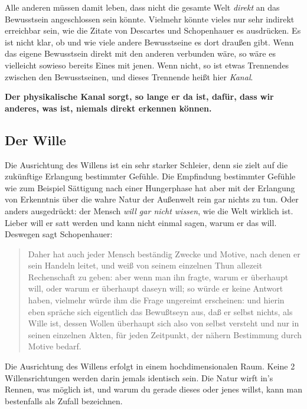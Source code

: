 \documentclass[12pt]{book}
\begin{document}
Alle anderen müssen damit leben, dass nicht die gesamte Welt \emph{direkt} an das Bewusstsein angeschlossen sein könnte. Vielmehr könnte vieles nur sehr indirekt erreichbar sein, wie die Zitate von Descartes und Schopenhauer es ausdrücken. Es ist nicht klar, ob und wie viele andere Bewusstseine es dort draußen gibt. Wenn das eigene Bewusstsein direkt mit den anderen verbunden wäre, so wäre es vielleicht sowieso bereits Eines mit jenen. Wenn nicht, so ist etwas Trennendes zwischen den Bewusstseinen, und dieses Trennende heißt hier \emph{Kanal}.

\textbf{Der physikalische Kanal sorgt, so lange er da ist, dafür, dass wir anderes, was ist, niemals direkt erkennen können.}

\subsection{Der Wille}

Die Ausrichtung des Willens ist ein sehr starker Schleier, denn sie zielt auf die zukünftige Erlangung bestimmter Gefühle. Die Empfindung bestimmter Gefühle wie zum Beispiel Sättigung nach einer Hungerphase hat aber mit der Erlangung von Erkenntnis über die wahre Natur der Außenwelt rein gar nichts zu tun. Oder anders ausgedrückt: der Mensch \emph{will gar nicht wissen}, wie die Welt wirklich ist. Lieber will er satt werden und kann nicht einmal sagen, warum er das will. Deswegen sagt Schopenhauer:

\begin{quote}\begin{tcolorbox}
Daher hat auch jeder Mensch beständig Zwecke und Motive, nach denen er sein Handeln leitet, und weiß von seinem einzelnen Thun allezeit Rechenschaft zu geben: aber wenn man ihn fragte, warum er überhaupt will, oder warum er überhaupt daseyn will; so würde er keine Antwort haben, vielmehr würde ihm die Frage ungereimt erscheinen: und hierin eben spräche sich eigentlich das Bewußtseyn aus, daß er selbst nichts, als Wille ist, dessen Wollen überhaupt sich also von selbst versteht und nur in seinen einzelnen Akten, für jeden Zeitpunkt, der nähern Bestimmung durch Motive bedarf.
\end{tcolorbox}\end{quote}

Die Ausrichtung des Willens erfolgt in einem hochdimensionalen Raum. Keine 2 Willensrichtungen werden darin jemals identisch sein. Die Natur wirft in's Rennen, was möglich ist, und warum du gerade dieses oder jenes willst, kann man bestenfalls als Zufall bezeichnen.
\end{document}
